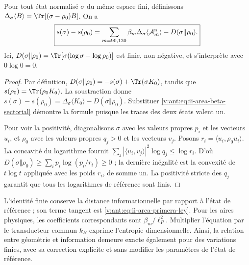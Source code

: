 \begin{theorem}
\label{v:ant:thm:ii-area-ley-finita}
Pour tout état normalisé \(\sigma\) du même espace fini,
définissons \(\Delta_\sigma\langle B\rangle
=\Tr[(\sigma-\rho_0)B]\). On a
\begin{equation}
 \boxed{
 s(\sigma)-s(\rho_0)
 =\sum_{m=90,120}\beta_m
      \Delta_\sigma\langle\mathcal A_m^{\rm n}\rangle
   -D(\sigma\Vert\rho_0).}
 \label{v:ant:eq:ii-area-ley-finita}
\end{equation}
Ici, \(D(\sigma\Vert\rho_0)=\Tr[\sigma(\log\sigma-\log\rho_0)]\)
est finie, non négative, et s'interprète avec \(0\log0=0\).
\end{theorem}
\begin{proof}
Par définition,
\(D(\sigma\Vert\rho_0)=-s(\sigma)+\Tr(\sigma K_0)\), tandis que
\(s(\rho_0)=\Tr(\rho_0K_0)\). La soustraction donne
\(s(\sigma)-s(\rho_0)=\Delta_\sigma\langle K_0\rangle
-D(\sigma\Vert\rho_0)\). Substituer
\eqref{v:ant:eq:ii-area-beta-sectorial} démontre la formule puisque les
traces des deux états valent un.

Pour voir la positivité, diagonalisons \(\sigma\) avec les valeurs propres
\(p_i\) et les vecteurs \(u_i\), et \(\rho_0\) avec les valeurs propres
\(q_j>0\) et les vecteurs \(v_j\). Posons
\(r_i=\langle u_i,\rho_0u_i\rangle\). La concavité du logarithme
fournit
\(\sum_j|\langle u_i,v_j\rangle|^2\log q_j\le\log r_i\).
D'où
\(D(\sigma\Vert\rho_0)\ge\sum_i p_i\log(p_i/r_i)\ge0\) ;
la dernière inégalité est la convexité de \(t\log t\) appliquée
avec les poids \(r_i\), de somme un. La positivité stricte des
\(q_j\) garantit que tous les logarithmes de référence sont finis.
\end{proof}

L’identité finie conserve la distance informationnelle par rapport à
l’état de référence ; son terme tangent est
\eqref{v:ant:eq:ii-area-primera-ley}. Pour les aires physiques, les
coefficients correspondants sont \(\beta_m/\ell_P^2\).
Multiplier l’équation par le transducteur commun \(k_B\) exprime
l’entropie dimensionnelle. Ainsi, la relation entre géométrie et information
demeure exacte également pour des variations finies, avec sa correction
explicite et sans modifier les paramètres de l’état de référence.
